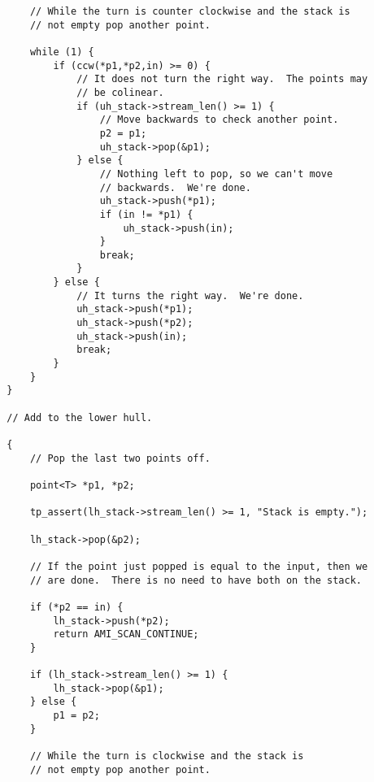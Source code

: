 \begin{verbatim}
            // While the turn is counter clockwise and the stack is
            // not empty pop another point.
            
            while (1) {                
                if (ccw(*p1,*p2,in) >= 0) {
                    // It does not turn the right way.  The points may
                    // be colinear.
                    if (uh_stack->stream_len() >= 1) {
                        // Move backwards to check another point.
                        p2 = p1;
                        uh_stack->pop(&p1);
                    } else {
                        // Nothing left to pop, so we can't move
                        // backwards.  We're done.
                        uh_stack->push(*p1);
                        if (in != *p1) {
                            uh_stack->push(in);
                        }
                        break;
                    }
                } else {
                    // It turns the right way.  We're done.
                    uh_stack->push(*p1);
                    uh_stack->push(*p2);
                    uh_stack->push(in);
                    break;
                }
            }
        }

        // Add to the lower hull.

        {
            // Pop the last two points off.

            point<T> *p1, *p2;

            tp_assert(lh_stack->stream_len() >= 1, "Stack is empty.");
            
            lh_stack->pop(&p2);

            // If the point just popped is equal to the input, then we
            // are done.  There is no need to have both on the stack.
            
            if (*p2 == in) {
                lh_stack->push(*p2);
                return AMI_SCAN_CONTINUE;
            }
            
            if (lh_stack->stream_len() >= 1) {
                lh_stack->pop(&p1);
            } else {
                p1 = p2;
            }
            
            // While the turn is clockwise and the stack is
            // not empty pop another point.
            

\end{verbatim}
